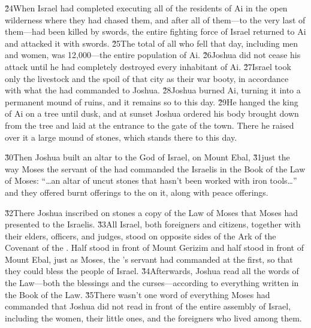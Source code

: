 \v{24}When Israel had completed executing all of the residents of Ai in the open wilderness where they had chased them, and after all of them---to the very last of them---had been killed by swords, the entire fighting force of Israel returned to Ai and attacked it with swords. \v{25}The total of all who fell that day, including men and women, was 12,000---the entire population of Ai. \v{26}Joshua did not cease his attack until he had completely destroyed every inhabitant of Ai. \v{27}Israel took only the livestock and the spoil of that city as their war booty, in accordance with what the  had commanded to Joshua. \v{28}Joshua burned Ai, turning it into a permanent mound of ruins, and it remains so to this day. \v{29}He hanged the king of Ai on a tree until dusk, and at sunset Joshua ordered his body brought down from the tree and laid at the entrance to the gate of the town. There he raised over it a large mound of stones, which stands there to this day.

\v{30}Then Joshua built an altar to the  God of Israel, on Mount Ebal, \v{31}just the way Moses the servant of the  had commanded the Israelis in the Book of the Law of Moses: ``{\ldots}an altar of uncut stones that hasn't been worked with iron tools{\ldots}'' and they offered burnt offerings to the  on it, along with peace offerings.

\v{32}There Joshua inscribed on stones a copy of the Law of Moses that Moses had presented to the Israelis. \v{33}All Israel, both foreigners and citizens, together with their elders, officers, and judges, stood on opposite sides of the Ark of the Covenant of the . Half stood in front of Mount Gerizim and half stood in front of Mount Ebal, just as Moses, the 's servant had commanded at the first, so that they could bless the people of Israel. \v{34}Afterwards, Joshua read all the words of the Law---both the blessings and the curses---according to everything written in the Book of the Law. \v{35}There wasn't one word of everything Moses had commanded that Joshua did not read in front of the entire assembly of Israel, including the women, their little ones, and the foreigners who lived among them.

